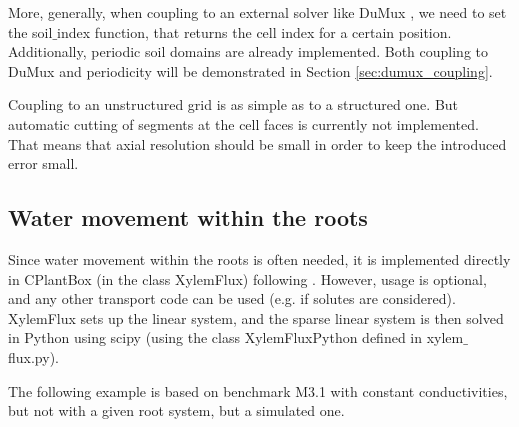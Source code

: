 More, generally, when coupling to an external solver like DuMux \citep{koch2020dumux}, we need to set the soil$\_$index function, that returns the cell index for a certain position. Additionally, periodic soil domains are already implemented. Both coupling to DuMux and periodicity will be demonstrated in Section \ref{sec:dumux_coupling}.

Coupling to an unstructured grid is as simple as to a structured one. But automatic cutting of segments at the cell faces is currently not implemented. That means that axial resolution should be small in order to keep the introduced error small.



\subsection{Water movement within the roots} \label{ssec:xylem}

Since water movement within the roots is often needed, it is implemented directly in CPlantBox (in the class XylemFlux) following \cite{meunier2017hybrid}. However, usage is optional, and any other transport code can be used (e.g. if solutes are considered). XylemFlux sets up the linear system, and the sparse linear system is then solved in Python using scipy (using the class XylemFluxPython defined in xylem$\_$flux.py).

The following example is based on benchmark M3.1 \citep{schnepf2019call} with constant conductivities, but not with a given root system, but a simulated one.

